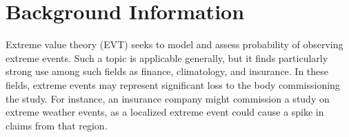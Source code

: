 
\section{Background Information}
Extreme value theory (EVT) seeks to model and assess probability of observing
  extreme events.  Such a topic is applicable generally, but it finds
  particularly strong use among such fields as finance, climatology, and insurance.
  \findcite  In these fields, extreme events may represent significant loss to
  the body commissioning the study.  For instance, an insurance company might
  commission a study on extreme weather events, as a localized extreme event
  could cause a spike in claims from that region.
  

